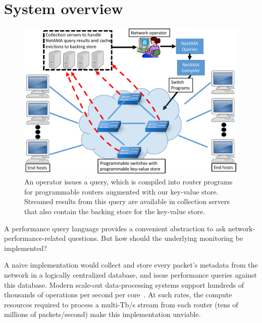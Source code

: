 \section{System overview}
\label{s:overview}
\begin{figure}[!t]
\centering
\includegraphics[width=0.7\columnwidth]{pq_overview.pdf}
\caption{An operator issues a \TheSystem query, which is compiled into
router programs for programmable routers augmented with our
key-value store. Streamed results from this query are available in
collection servers that also contain the backing store for the key-value
store.}
\label{fig:overview}
\end{figure}

A performance query language provides a convenient abstraction to ask
network-performance-related questions. But how should the underlying monitoring
be implemented?

A naive implementation would collect and store every packet's metadata
from the network in a logically centralized database, and issue performance
queries against this database. %
Modern scale-out data-processing systems support hundreds of thousands of
operations per second per core~\cite{kafka_benchmark, redis_benchmark,
  memcached_benchmark, redis_vs_memcached, redis_vs_memcached_update}. At such
rates, the compute resources required to process a multi-Tb/s stream from each
router (tens of millions of packets/second) make this implementation
unviable.

